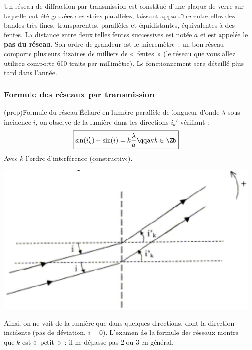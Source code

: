 \documentclass[../main/main.tex]{subfiles}
\begin{document}
{Un réseau de diffraction par transmission est constitué d'une plaque de verre
sur laquelle ont été gravées des stries parallèles, laissant apparaître entre
elles des bandes très fines, transparentes, parallèles et équidistantes,
équivalentes à des fentes. La distance entre deux telles fentes successives est
notée $a$ et est appelée le \textbf{pas du réseau}. Son ordre de grandeur est le
micromètre~: un bon réseau comporte plusieurs dizaines de milliers de «~fentes~»
(le réseau que vous allez utilisez comporte 600 traits par millimètre). Le
fonctionnement sera détaillé plus tard dans l'année.


\subsubsection{Formule des réseaux par transmission}

\begin{tcb}[sidebyside, righthand ratio=.4](prop){Formule du réseau}
Éclairé en lumière parallèle de longueur d'onde $\lambda$ sous incidence $i$, on
observe de la lumière dans les directions $i_{k}'$ vérifiant~:
\[
  \boxed{\sin(i_{k}')-\sin(i) = k\frac{\lambda}{a} \qqav k\in \Zb}
\]
Avec $k$ l'ordre d'interférence (constructive).
\tcblower
  \begin{center}
      \includegraphics[width=\linewidth]{reseau}
  \end{center}
\end{tcb}
Ainsi, on ne voit de la lumière
que dans quelques directions, dont la direction incidente (pas de déviation,
$i=0$). L'examen de la formule des réseaux montre que $k$ est «~petit~»~: il ne
dépasse pas 2 ou 3 en général.

}
\end{document}
